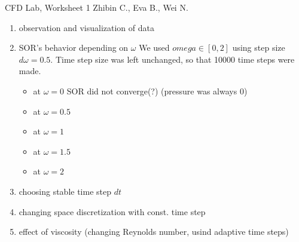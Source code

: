 \documentclass[a4paper]{article}
\begin{document}
{\Large CFD Lab, Worksheet 1} \newline
{\small Zhibin C., Eva B., Wei N.}

\begin{enumerate}
\item observation and visualization of data
\item SOR's behavior depending on $\omega$
We used $omega \in [0, 2]$ using step size $d\omega=0.5$.
Time step size was left unchanged, so that 10000 time steps were made.

\begin{itemize}
\item at $\omega=0$ SOR did not converge(?) (pressure was always 0)
\item at $\omega=0.5$
\item at $\omega=1$
\item at $\omega=1.5$
\item at $\omega=2$
\end{itemize}

\item choosing stable time step $dt$
\item changing space discretization with const. time step
\item effect of viscosity (changing Reynolds number, usind adaptive time steps)
\end{enumerate}
\end{document}

